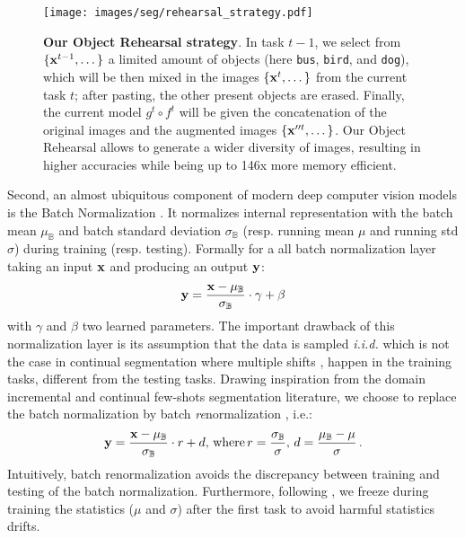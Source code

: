 \begin{figure}[ht!]
    \centering
    \texttt{[image: images/seg/rehearsal\_strategy.pdf]}
    \caption{\textbf{Our Object Rehearsal strategy}. In task $t-1$, we select from $\{\mathbf{x}^{t-1},
            \dots \}$ a limited amount of objects (here \texttt{bus}, \texttt{bird}, and
        \texttt{dog}), which will be then mixed in the images $\{\mathbf{x}^{t}, \dots \}$ from the
        current task $t$; after pasting, the other present objects are erased. Finally, the
        current model $g^t \circ f^t$ will be given the concatenation of the original images
        and the augmented images $\{\mathbf{x}''^t, \dots\}$. Our Object Rehearsal allows to generate
        a wider diversity of images, resulting in higher accuracies while being up to 146x more
        memory efficient.}
    \label{fig:seg_model_objectrehearsal}
\end{figure}

Second, an almost ubiquitous component of modern deep computer vision models is the Batch
Normalization \citep{ioffe2015batchnorm}. It normalizes internal representation with the batch mean
$\mu_\mathbb{B}$ and batch standard deviation $\sigma_\mathbb{B}$ (resp. running mean $\mu$ and
running std $\sigma$) during training (resp. testing). Formally for a all batch normalization layer
taking an input $\mathbf{x}$ and producing an output $\mathbf{y}$:
%
\begin{equation}
    \mathbf{y} = \frac{\mathbf{x} - \mu_\mathbb{B}}{\sigma_\mathbb{B}} \cdot \gamma + \beta
    \label{eq:seg_batch_norm}
\end{equation}
%
with $\gamma$ and $\beta$ two learned parameters. The important drawback of this normalization layer
is its assumption that the data is sampled \textit{i.i.d.} which is not the case in continual
segmentation where multiple shifts
\citep{morenotorresa2012datasetshift,lesort2021driftanalysis,douillardlesort2021continuum}, happen in
the training tasks, different from the testing tasks. Drawing inspiration from the domain
incremental \citep{lomonaco2020ar1} and continual few-shots segmentation
\citep{cermelli2020fewshotcontinualsegm} literature, we choose to replace the batch normalization by
batch \textit{re}normalization \citep{ioffe2017batchrenorm}, i.e.:
%
\begin{equation}
    \mathbf{y} = \frac{\mathbf{x} - \mu_\mathbb{B}}{\sigma_\mathbb{B}} \cdot r + d,\,\text{where}\, r = \frac{\sigma_\mathbb{B}}{\sigma},\, d = \frac{\mu_\mathbb{B} - \mu}{\sigma}\,.
    \label{eq:seg_batch_renorm}
\end{equation}
%
Intuitively, batch renormalization avoids the discrepancy between training and testing of the batch
normalization. Furthermore, following \cite{cermelli2020fewshotcontinualsegm}, we freeze during
training the statistics ($\mu$ and $\sigma$) after the first task to avoid harmful statistics
drifts.

